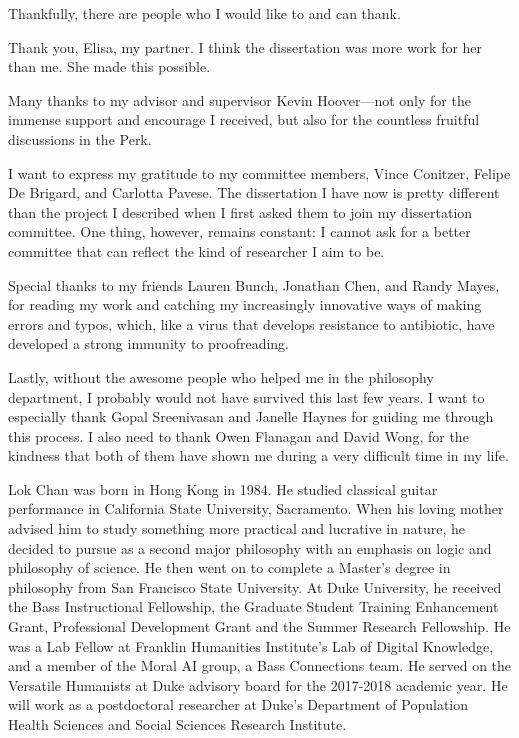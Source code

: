 \documentclass[PhD]{dukethesis2006}
\begin{document}
Thankfully, there are people who I would like to and can thank.

Thank you, Elisa, my partner. I think the dissertation was more work for her than me. She made this possible. 

Many thanks to my advisor and supervisor Kevin Hoover---not only for the immense support and encourage I received, but also for the countless fruitful discussions in the Perk. 

I want to express my gratitude to my committee members, Vince Conitzer, Felipe De Brigard, and Carlotta Pavese. The dissertation I have now is pretty different than the project I described when I first asked them to join my dissertation committee. One thing, however, remains constant: I cannot ask for a better committee that can reflect the kind of researcher I aim to be. 

Special thanks to my friends Lauren Bunch, Jonathan Chen, and Randy Mayes, for reading my work and catching my increasingly innovative ways of making errors and typos, which, like a virus that develops resistance to antibiotic, have developed a strong immunity to proofreading.

Lastly, without the awesome people who helped me in the philosophy department, I probably would not have survived this last few years. I want to especially thank Gopal Sreenivasan and Janelle Haynes for guiding me through this process. I also need to thank Owen Flanagan and David Wong, for the kindness that both of them have shown me during a very difficult time in my life. 









\singlespacing
\printbibliography[heading=bibintoc]
\doublespacing
\biography

	Lok Chan was born in Hong Kong in 1984. He studied classical guitar performance in California State University, Sacramento. When his loving mother advised him to study something more practical and lucrative in nature, he decided to pursue as a second major philosophy with an emphasis on logic and philosophy of science. He then went on to complete a Master's degree in philosophy from San Francisco State University. At Duke University, he received the Bass Instructional Fellowship, the Graduate Student Training Enhancement Grant, Professional Development Grant and the Summer Research Fellowship. He was a Lab Fellow at Franklin Humanities Institute's Lab of Digital Knowledge, and a member of the Moral AI group, a Bass Connections team. He served on the Versatile Humanists at Duke advisory board for the 2017-2018 academic year. He will work as a postdoctoral researcher at Duke's Department of Population Health Sciences and Social Sciences Research Institute.
\end{document}
